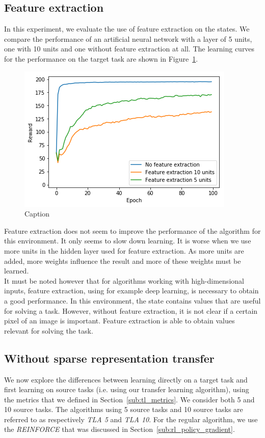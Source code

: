 \subsection{Feature extraction} %
\label{sub:feature_extraction}
In this experiment, we evaluate the use of feature extraction on the states. We compare the performance of an artificial neural network with a layer of 5 units, one with 10 units and one without feature extraction at all. The learning curves for the performance on the target task are shown in Figure~\ref{fig:CartPole:feature_extraction}.
\begin{figure}[htb]
    \centering
    \includegraphics[width=.8\linewidth]{images/results/CartPole/feature_extraction.png}
    \caption{Caption}
    \label{fig:CartPole:feature_extraction}
\end{figure}
Feature extraction does not seem to improve the performance of the algorithm for this environment. It only seems to slow down learning. It is worse when we use more units in the hidden layer used for feature extraction. As more units are added, more weights influence the result and more of these weights must be learned.\\
It must be noted however that for algorithms working with high-dimensional inputs, feature extraction, using for example deep learning, is necessary to obtain a good performance. In this environment, the state contains values that are useful for solving a task. However, without feature extraction, it is not clear if a certain pixel of an image is important. Feature extraction is able to obtain values relevant for solving the task.

\subsection{Without sparse representation transfer} %
\label{sub:cartpole:without_sparse_representation_transfer}
We now explore the differences between learning directly on a target task and first learning on source tasks (i.e. using our transfer learning algorithm), using the metrics that we defined in Section~\ref{sub:tl_metrics}.
We consider both 5 and 10 source tasks.
The algorithms using 5 source tasks and 10 source tasks are referred to as respectively \textit{TLA 5} and \textit{TLA 10}.
For the regular algorithm, we use the \textit{REINFORCE} that was discussed in Section~\ref{sub:rl_policy_gradient}.

